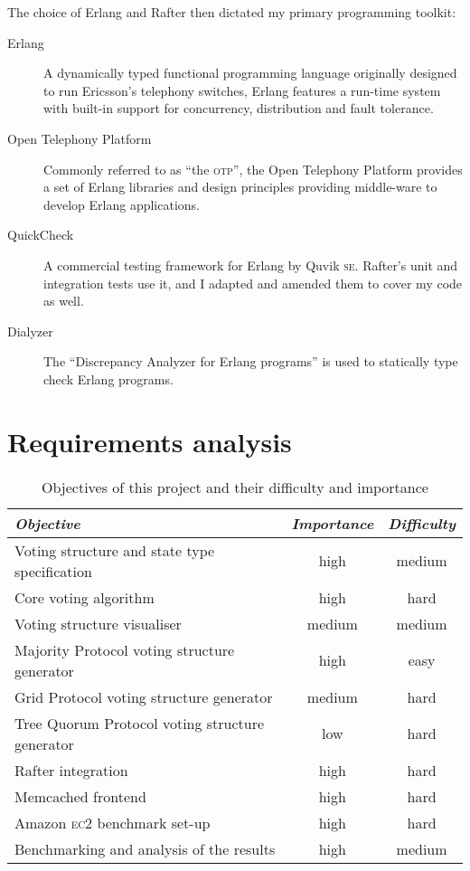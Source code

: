 \documentclass[11pt,chapterprefix=true,toc=bibliography,numbers=noendperiod,
               footnotes=multiple,twoside]{scrreprt}
\newcommand{\ECC}[0]{\textsc{ec}2 }
\begin{document}
The choice of Erlang and Rafter then dictated my primary programming toolkit:

\begin{description}
    \item[Erlang] A dynamically typed functional programming language originally designed to run Ericsson's telephony switches, Erlang features a run-time system with built-in support for concurrency, distribution and fault tolerance.
    \item[Open Telephony Platform] Commonly referred to as \enquote{the \textsc{otp}}, the Open Telephony Platform provides a set of Erlang libraries and design principles providing middle-ware to develop Erlang applications.
    \item[QuickCheck] A commercial testing framework for Erlang by Quvik \textsc{se}. Rafter's unit and integration tests use it, and I adapted and amended them to cover my code as well.
    \item[Dialyzer] The \enquote{Discrepancy Analyzer for Erlang programs} is used to statically type check Erlang programs.
\end{description}

\section{Requirements analysis\label{sc:requirements-analysis}}

\begin{table}[h]
    \centering
    \begin{tabularx}{\textwidth}{X c c}
        \toprule
        \textit{Objective} & \textit{Importance} & \textit{Difficulty} \\
        \midrule
        Voting structure and state type specification & high & medium \\
        Core voting algorithm & high & hard \\
        Voting structure visualiser & medium & medium \\
        Majority Protocol voting structure generator & high & easy \\
        Grid Protocol voting structure generator & medium & hard \\
        Tree Quorum Protocol voting structure generator & low & hard \\
        Rafter integration & high & hard \\
        Memcached frontend & high & hard \\
        Amazon \ECC benchmark set-up & high & hard \\
        Benchmarking and analysis of the results & high & medium \\
        \bottomrule
    \end{tabularx}
    \caption{Objectives of this project and their difficulty and importance}
    \label{tab:objectives}
\end{table}
\end{document}
